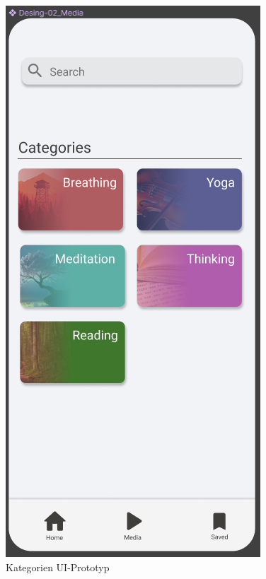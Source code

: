 \begin{figure}[H]
\begin{minipage}{0.5\textwidth}
        \includegraphics[height=2\textwidth]{./pics/pKategorien.png}
        \caption{Kategorien UI-Prototyp}
    \end{minipage}
    \begin{minipage}{0.5\textwidth}
        \centering

\end{minipage}
\end{figure}
